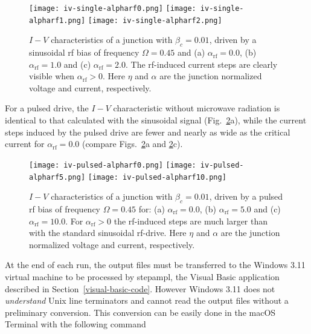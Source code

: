 \begin{figure}[tb]
{
	\fboxsep=0pt
	\mbox{\texttt{[image: iv-single-alpharf0.png]}}
	\hfill
	\mbox{\texttt{[image: iv-single-alpharf1.png]}}
	\hfill
	\mbox{\texttt{[image: iv-single-alpharf2.png]}}
}
	\caption{$I - V$ characteristics of a junction with $\beta_c = 0.01$, driven by a sinusoidal rf bias of frequency $\Omega = 0.45$ and (a) $\alpha_\mathrm{rf} = 0.0$, (b) $\alpha_\mathrm{rf} = 1.0$ and (c) $\alpha_\mathrm{rf} = 2.0$. The rf-induced current steps are clearly visible when $\alpha_\mathrm{rf} > 0$. Here $\eta$ and $\alpha$ are the junction normalized voltage and current, respectively.}
	\label{fig:iv-single}
\end{figure}


For a pulsed drive, the $I - V$ characteristic without microwave radiation is identical to that calculated with the sinusoidal signal (Fig.~\ref{fig:iv-pulsed}a), while the current steps induced by the pulsed drive are fewer and nearly as wide as the critical current for $\alpha_\mathrm{rf} = 0.0$ (compare Figs.~\ref{fig:iv-pulsed}a and \ref{fig:iv-pulsed}c).

\begin{figure}[tb]
{
	\fboxsep=0pt
	\mbox{\texttt{[image: iv-pulsed-alpharf0.png]}}
	\hfill
	\mbox{\texttt{[image: iv-pulsed-alpharf5.png]}}
	\hfill
	\mbox{\texttt{[image: iv-pulsed-alpharf10.png]}}
}
	\caption{$I - V$ characteristics of a junction with $\beta_c = 0.01$, driven by a pulsed rf bias of frequency $\Omega = 0.45$ for: (a) $\alpha_\mathrm{rf} = 0.0$, (b) $\alpha_\mathrm{rf} = 5.0$ and (c) $\alpha_\mathrm{rf} = 10.0$. For $\alpha_\mathrm{rf} > 0$ the rf-induced steps are much larger than with the standard sinusoidal rf-drive. Here $\eta$ and $\alpha$ are the junction normalized voltage and current, respectively.}
	\label{fig:iv-pulsed}
\end{figure}


At the end of each run, the output files must be transferred to the Windows 3.11 virtual machine to be processed by \textsf{stepampl}, the Visual Basic application described in Section~\ref{visual-basic-code}. However Windows 3.11 does not \emph{understand} Unix line terminators and cannot read the output files without a preliminary conversion. 
This conversion can be easily done in the macOS Terminal with the following command

